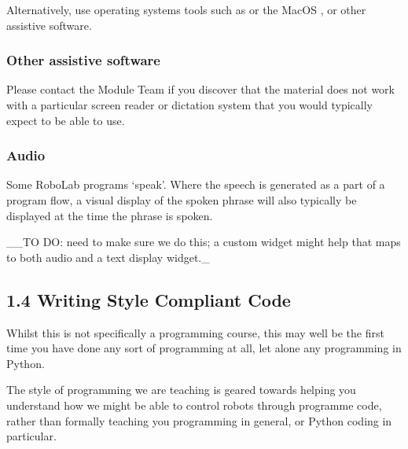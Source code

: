 \documentclass[letterpaper,10pt,english]{sphinxmanual}
\begin{document}
Alternatively, use operating systems tools such as  or the MacOS , or other assistive software.


\subsubsection{Other assistive software}
\label{\detokenize{content/00_READ_ME_FIRST/Section_00_03_Accessibility:Other-assistive-software}}

Please contact the Module Team if you discover that the material does not work with a particular screen reader or dictation system that you would typically expect to be able to use.


\subsubsection{Audio}
\label{\detokenize{content/00_READ_ME_FIRST/Section_00_03_Accessibility:Audio}}
Some RoboLab programs ‘speak’. Where the speech is generated as a part of a program flow, a visual display of the spoken phrase will also typically be displayed at the time the phrase is spoken.

\_\_TO DO: need to make sure we do this; a custom widget might help that maps to both audio and a text display widget.\_


\subsection{1.4 Writing Style Compliant Code}
\label{\detokenize{content/00_READ_ME_FIRST/Section_00_04_Writing_Code:1.4-Writing-Style-Compliant-Code}}\label{\detokenize{content/00_READ_ME_FIRST/Section_00_04_Writing_Code::doc}}

Whilst this is not specifically a programming course, this may well be the first time you have done any sort of programming at all, let alone any programming in Python.

The style of programming we are teaching is geared towards helping you understand how we might be able to control robots through programme code, rather than formally teaching you programming in general, or Python coding in particular.
\end{document}
